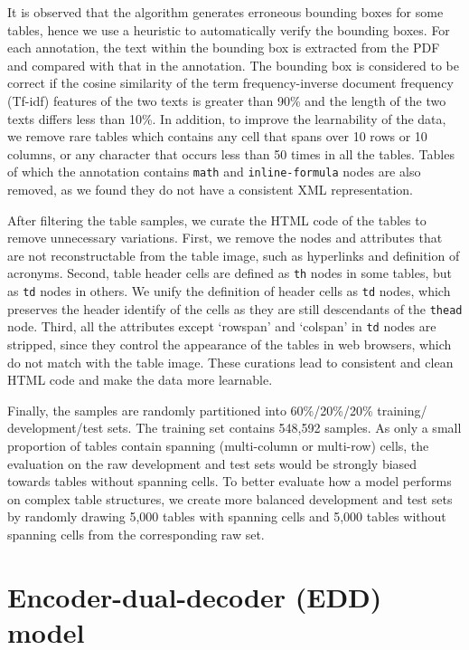 \documentclass[conference]{IEEEtran}
\begin{document}
It is observed that the algorithm generates erroneous bounding boxes for some
tables, hence we use a heuristic to automatically verify the bounding boxes. For
each annotation, the text within the bounding box is extracted from the PDF and
compared with that in the annotation. The bounding box is considered to be
correct if the cosine similarity of the term frequency-inverse document
frequency (Tf-idf) features of the two texts is greater than 90\% and the length
of the two texts differs less than 10\%. In addition, to improve the
learnability of the data, we remove rare tables which contains any cell that
spans over 10 rows or 10 columns, or any character that occurs less than 50
times in all the tables. Tables of which the annotation contains \texttt{math}
and \texttt{inline-formula} nodes are also removed, as we found they do not have
a consistent XML representation.

After filtering the table samples, we curate the HTML code of the tables to
remove unnecessary variations. First, we remove the nodes and attributes that
are not reconstructable from the table image, such as hyperlinks and definition
of acronyms. Second, table header cells are defined as \texttt{th} nodes in
some tables, but as \texttt{td} nodes in others. We unify the definition of
header cells as \texttt{td} nodes, which preserves the header identify of the
cells as they are still descendants of the \texttt{thead} node. Third, all the
attributes except `rowspan' and `colspan' in \texttt{td} nodes are stripped,
since they control the appearance of the tables in web browsers, which do not
match with the table image. These curations lead to consistent and clean HTML
code and make the data more learnable.

Finally, the samples are randomly partitioned into 60\%/20\%/20\%
training/\\development/test sets. The training set contains 548,592 samples.
As only a small proportion of tables contain spanning (multi-column or
multi-row) cells, the evaluation on the raw development and test sets would be
strongly biased towards tables without spanning cells. To better
evaluate how a model performs on complex table structures, we create more
balanced development and test sets by randomly drawing 5,000 tables with
spanning cells and 5,000 tables without spanning cells from the corresponding
raw set.

\section{Encoder-dual-decoder (EDD) model}
\end{document}
